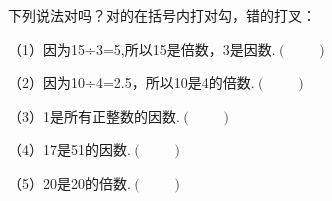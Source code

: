 下列说法对吗？对的在括号内打对勾，错的打叉：

（1）因为15÷3=5,所以15是倍数，3是因数.\hfill$\left(\qquad\right)$

（2）因为10÷4=2.5，所以10是4的倍数.\hfill$\left(\qquad\right)$

（3）1是所有正整数的因数.\hfill$\left(\qquad\right)$

（4）17是51的因数.\hfill$\left(\qquad\right)$

（5）20是20的倍数.\hfill$\left(\qquad\right)$